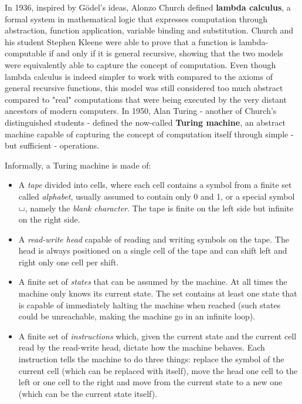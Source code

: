 In 1936, inspired by Gödel's ideas, Alonzo Church defined \textbf{lambda calculus}, a formal system in mathematical logic that expresses computation through abstraction, function application, variable binding and substitution. Church \cite{church} and his student Stephen Kleene \cite{kleene} were able to prove that a function is lambda-computable if and only if it is general recursive, showing that the two models were equivalently able to capture the concept of computation. Even though lambda calculus is indeed simpler to work with compared to the axioms of general recursive functions, this model was still considered too much abstract compared to "real" computations that were being executed by the very distant ancestors of modern computers. In 1950, Alan Turing - another of Church's distinguished students - defined the now-called \textbf{Turing machine}, an abstract machine capable of capturing the concept of computation itself through simple - but sufficient - operations.

Informally, a Turing machine is made of:
\begin{itemize}
    \item A \textit{tape} divided into cells, where each cell contains a symbol from a finite set called \textit{alphabet}, usually assumed to contain only 0 and 1, or a special symbol $\blankchar$, namely the \textit{blank character}. The tape is finite on the left side but infinite on the right side. 
    \item A \textit{read-write head} capable of reading and writing symbols on the tape. The head is always positioned on a single cell of the tape and can shift left and right only one cell per shift.
    \item A finite set of \textit{states} that can be assumed by the machine. At all times the machine only knows its current state. The set contains at least one state that is capable of immediately halting the machine when reached (such states could be unreachable, making the machine go in an infinite loop).
    \item A finite set of \textit{instructions} which, given the current state and the current cell read by the read-write head, dictate how the machine behaves. Each instruction tells the machine to do three things: replace the symbol of the current cell (which can be replaced with itself), move the head one cell to the left or one cell to the right and move from the current state to a new one (which can be the current state itself).
\end{itemize}

